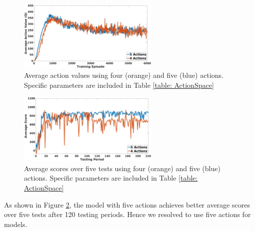 \begin{figure}[h]
\centering
\includegraphics[width=0.6\textwidth]{Graphics/AveQ_action.jpg}
\caption[Average Action Values Action Space Comparison]{Average action values using four (orange) and five (blue) actions.
Specific parameters are included in Table \ref{table: ActionSpace}}
\label{fig:action_test}
\end{figure}

\begin{figure}[h]
\centering
\includegraphics[width=0.6\textwidth]{Graphics/TestScore_action.jpg}
\caption[Average Test Score Action Space Comparison]{Average scores over five tests using four (orange) and five (blue) actions.
Specific parameters are included in Table \ref{table: ActionSpace}}
\label{fig:action_aveq}
\end{figure}

As shown in Figure \ref{fig:action_aveq}, the model with five actions achieves better average scores over five tests after 120 testing periods. Hence we resolved to use five actions for models.

\newpage
